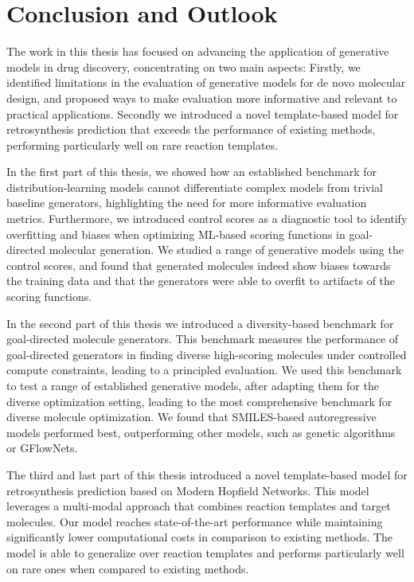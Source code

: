 \chapter{Conclusion and Outlook\label{chap:conclusion}} The work in this thesis has focused on
advancing the application of generative models in drug discovery, concentrating on two main aspects:
Firstly, we identified limitations in the evaluation of generative models for de novo molecular
design, and proposed ways to make evaluation more informative and relevant to practical
applications. Secondly we introduced a novel template-based model for retrosynthesis prediction that
exceeds the performance of existing methods, performing particularly well on rare reaction
templates.

In the first part of this thesis, we showed how an established benchmark for
distribution-learning models cannot differentiate complex models from trivial baseline generators,
highlighting the need for more informative evaluation metrics. Furthermore, we introduced control
scores as a diagnostic tool to identify overfitting and biases when optimizing \ac{ML}-based scoring
functions in goal-directed molecular generation. We studied a range of generative models
using the control scores, and found that generated molecules indeed show biases towards the
training data and that the generators were able to overfit to artifacts of the scoring functions.


In the second part of this thesis we introduced a diversity-based benchmark for goal-directed
molecule generators. This benchmark measures the performance of goal-directed generators in finding
diverse high-scoring molecules under controlled compute constraints, leading to a principled
evaluation. We used this benchmark to test a range of established generative models, after adapting
them for the diverse optimization setting, leading to the most comprehensive benchmark for diverse
molecule optimization. We found that SMILES-based autoregressive models performed best,
outperforming other models, such as genetic algorithms or GFlowNets.

The third and last part of this thesis introduced a novel template-based model for retrosynthesis
prediction based on Modern Hopfield Networks. This model leverages a multi-modal approach that
combines reaction templates and target molecules. Our model reaches state-of-the-art performance
while maintaining significantly lower computational costs in comparison to existing methods. The model
is able to generalize over reaction templates and performs particularly well on rare ones when
compared to existing methods.

